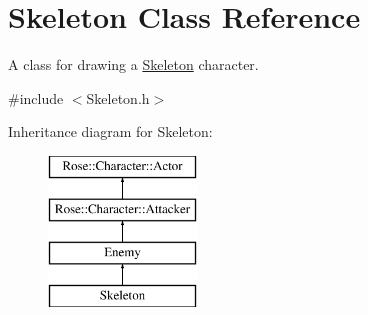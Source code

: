\hypertarget{classSkeleton}{}\section{Skeleton Class Reference}
\label{classSkeleton}


A class for drawing a \mbox{\hyperlink{classSkeleton}{Skeleton}} character.  




{\ttfamily \#include $<$Skeleton.\+h$>$}

Inheritance diagram for Skeleton\+:\begin{figure}[H]
\begin{center}
\leavevmode
\includegraphics[height=4.000000cm]{classSkeleton}
\end{center}
\end{figure}
